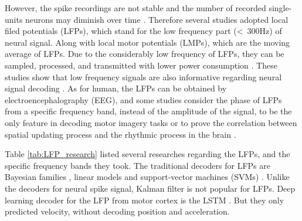 

However, the spike recordings are not stable and the number of recorded single-units neurons may diminish over time \citep{ahmadi2019end}. 
Therefore several studies adopted local filed potentials (LFPs), which stand for the low frequency part (<~300Hz) of neural signal. 
Along with local motor potentials (LMPs), which are the moving average of LFPs. 
Due to the considerably low frequency of LFPs, they can be sampled, processed, and transmitted with lower power consumption \citep{flint2012accurate}.
These studies show that low frequency signals are also informative regarding neural signal decoding \citep{wang2014long}. 
As for human, the LFPs can be obtained by electroencephalography (EEG), and some studies consider the phase of LFPs from a specific frequency band, 
instead of the amplitude of the signal, to be the only feature in decoding motor imagery tasks \citep{kumar2018eeg} or to prove the correlation between spatial updating process and the rhythmic process in the brain \citep{mclelland2016phase}.


Table \ref{tab:LFP_research} listed several researches regarding the LFPs,
and the specific frequency bands they took.
The traditional decoders for LFPs are Bayesian families \citep{scherberger2005cortical, quiroga2009, ince2010high},
linear models \citep{flint2012accurate, tan2016decoding} and support-vector machines (SVMs) \citep{kumar2018eeg}.
Unlike the decoders for neural spike signal, Kalman filter is not popular for LFPs.
Deep learning decoder for the LFP from motor cortex is the LSTM \citep{ahmadi2019decoding}.
But they only predicted velocity, without decoding position and acceleration.



